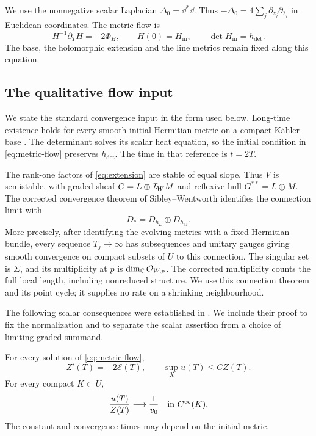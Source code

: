 We use the nonnegative scalar Laplacian $\Delta_0=\dd^*\dd$.
Thus $-\Delta_0=4\sum_j\partial_{z_j}\partial_{\bar z_j}$
in Euclidean coordinates. The metric flow is
\begin{equation}\label{eq:metric-flow}
 H^{-1}\partial_TH=-2\Phi_H,\qquad
 H(0)=H_{\mathrm{in}},\qquad \det H_{\mathrm{in}}=h_{\det}.
\end{equation}
The base, the holomorphic extension and the line metrics remain
fixed along this equation.

\subsection{The qualitative flow input}

We state the standard convergence input in the form used below.
Long-time existence holds for every smooth initial Hermitian
metric on a compact K\"ahler base
\cite[Theorem~6.8.25]{Kobayashi87}.
The determinant solves its scalar heat equation, so the initial
condition in \eqref{eq:metric-flow} preserves $h_{\det}$.
The time in that reference is $t=2T$.

The rank-one factors of \eqref{eq:extension} are stable of equal
slope. Thus $V$ is semistable, with graded sheaf
$G=L\oplus\mathcal I_WM$ and reflexive hull $G^{**}=L\oplus M$.
The corrected convergence theorem of Sibley--Wentworth
\cite[Theorem~1.1 and Remark~1.2, with the appended erratum]{SibleyWentworth15}
identifies the connection limit with
\begin{equation}\label{eq:graded-connection}
                 D_*=D_{h_L}\oplus D_{h_M}.
\end{equation}
More precisely, after identifying the evolving metrics with a
fixed Hermitian bundle, every sequence $T_j\to\infty$ has
subsequences and unitary gauges giving smooth convergence on
compact subsets of $U$ to this connection. The singular set is
$\Sigma$, and its multiplicity at $p$ is
$\dim_\mathbb C\mathcal O_{W,p}$. The corrected multiplicity counts the full
local length, including nonreduced structure. We use this
connection theorem and its point cycle; it supplies no rate on
a shrinking neighbourhood.

The following scalar consequences were established in
\cite[Section~5]{W_Singular}. We include their proof to fix the
normalization and to separate the scalar assertion from a
choice of limiting graded summand.

\begin{proposition}\label{prop:qualitative-flow}
For every solution of \eqref{eq:metric-flow},
\begin{equation}\label{eq:exact-dissipation}
       Z'(T)=-2\mathcal E(T),\qquad
       \sup_Xu(T)\le CZ(T).
\end{equation}
For every compact $K\subset U$,
\begin{equation}\label{eq:normalized-exterior}
          \frac{u(T)}{Z(T)}\longrightarrow\frac1{v_0}
                     \quad\hbox{in }C^\infty(K).
\end{equation}
The constant and convergence times may depend on the initial metric.
\end{proposition}

